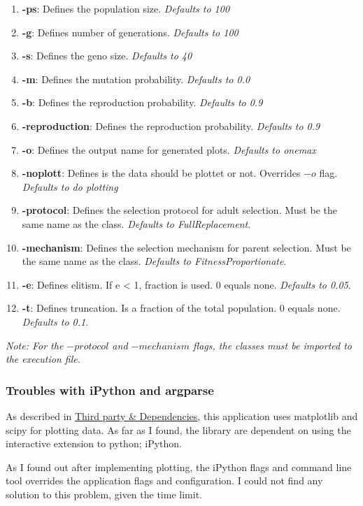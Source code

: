 \begin{enumerate}
	\item \textbf{-ps}: Defines the population size. \textit{Defaults to 100}
	\item \textbf{-g}: Defines number of generations. \textit{Defaults to 100}
	\item \textbf{-s}: Defines the geno size. \textit{Defaults to 40}
	\item \textbf{-m}: Defines the mutation probability. \textit{Defaults to 0.0}
	\item \textbf{-b}: Defines the reproduction probability. \textit{Defaults to 0.9}
	\item \textbf{-reproduction}: Defines the reproduction probability. \textit{Defaults to 0.9}
	\item \textbf{-o}: Defines the output name for generated plots. \textit{Defaults to onemax}
	\item \textbf{-noplott}: Defines is the data should be plottet or not. Overrides $-o$ flag. \textit{Defaults to do plotting}
	\item \textbf{-protocol}: Defines the selection protocol for adult selection. Must be the same name as the class. \textit{Defaults to FullReplacement}.
	\item \textbf{-mechanism}: Defines the selection mechanism for parent selection. Must be the same name as the class. \textit{Defaults to FitnessProportionate}.
	\item \textbf{-e}: Defines elitism. If e < 1, fraction is used. 0 equals none. \textit{Defaults to 0.05}.
	\item \textbf{-t}: Defines truncation. Is a fraction of the total population.  0 equals none. \textit{Defaults to 0.1}.

\end{enumerate}

\textit{Note: For the $-protocol$ and $-mechanism$ flags, the classes must be imported to the execution file.}

\subsubsection{Troubles with iPython and argparse}
As described in \hyperref[sec:thirdparty]{Third party \& Dependencies}, this application uses matplotlib and scipy 
for plotting data. As far as I found, the library are dependent on using the interactive extension to python; iPython.

As I found out after implementing plotting, the iPython flags and command line tool overrides the application flags 
and configuration. I could not find any solution to this problem, given the time limit. 


